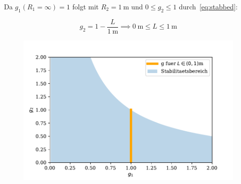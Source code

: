\documentclass[10pt, aspectratio=169]{beamer}
\begin{document}
\begin{frame}
  Da \(g_1(R_1=\infty)=1\) folgt mit
  \(R_2=\SI{1}{\meter}\) und \(0\leq g_2\leq 1\)
  durch~\ref{eq:stabbed}:

  \begin{equation}
    \label{eq:stabber}
    g_2=1-\frac{L}{\SI{1}{\meter}}\implies\SI{0}{\meter}\leq L \leq \SI{1}{\meter}
  \end{equation}

  \begin{figure}[H]\centering
    \includegraphics[width=.5\columnwidth]{figs/stabdiag.pdf}
  \end{figure}
\end{frame}
\end{document}
